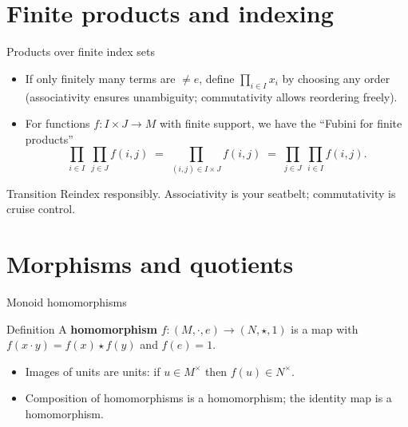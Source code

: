 \documentclass[aspectratio=169,11pt]{beamer}
\begin{document}
\section{Finite products and indexing}
\begin{frame}{Products over finite index sets}
\begin{itemize}
  \item If only finitely many terms are $\ne e$, define $\prod_{i\in I} x_i$ by choosing any order (associativity ensures unambiguity; commutativity allows reordering freely).
  \item For functions $f:I\times J\to M$ with finite support, we have the ``Fubini for finite products''
  \[
    \prod_{i\in I}\ \prod_{j\in J} f(i,j)\;=\;\prod_{(i,j)\in I\times J} f(i,j)\;=\;\prod_{j\in J}\ \prod_{i\in I} f(i,j).
  \]
\end{itemize}
\begin{block}{Transition}
Reindex responsibly. Associativity is your seatbelt; commutativity is cruise control.
\end{block}
\end{frame}

\section{Morphisms and quotients}
\begin{frame}{Monoid homomorphisms}
\begin{block}{Definition}
A \textbf{homomorphism} $f:(M,\cdot,e)\to (N,\star,1)$ is a map with $f(x\cdot y)=f(x)\star f(y)$ and $f(e)=1$.
\end{block}
\begin{itemize}
  \item Images of units are units: if $u\in M^\times$ then $f(u)\in N^\times$.
  \item Composition of homomorphisms is a homomorphism; the identity map is a homomorphism.
\end{itemize}
\end{frame}
\end{document}
